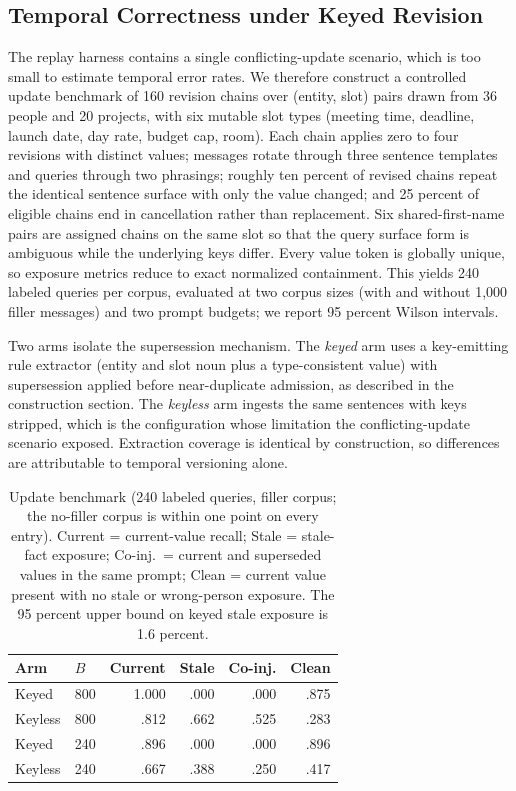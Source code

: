 \documentclass[letterpaper]{article} %
\begin{document}
\subsection{Temporal Correctness under Keyed Revision}

The replay harness contains a single conflicting-update scenario, which is too small to estimate temporal error rates. We therefore construct a controlled update benchmark of 160 revision chains over (entity, slot) pairs drawn from 36 people and 20 projects, with six mutable slot types (meeting time, deadline, launch date, day rate, budget cap, room). Each chain applies zero to four revisions with distinct values; messages rotate through three sentence templates and queries through two phrasings; roughly ten percent of revised chains repeat the identical sentence surface with only the value changed; and 25 percent of eligible chains end in cancellation rather than replacement. Six shared-first-name pairs are assigned chains on the same slot so that the query surface form is ambiguous while the underlying keys differ. Every value token is globally unique, so exposure metrics reduce to exact normalized containment. This yields 240 labeled queries per corpus, evaluated at two corpus sizes (with and without 1{,}000 filler messages) and two prompt budgets; we report 95 percent Wilson intervals.

Two arms isolate the supersession mechanism. The \emph{keyed} arm uses a key-emitting rule extractor (entity and slot noun plus a type-consistent value) with supersession applied before near-duplicate admission, as described in the construction section. The \emph{keyless} arm ingests the same sentences with keys stripped, which is the configuration whose limitation the conflicting-update scenario exposed. Extraction coverage is identical by construction, so differences are attributable to temporal versioning alone.

\begin{table}[t]
\centering
\small
\begin{tabular}{@{}llrrrr@{}}
\toprule
Arm & $B$ & Current & Stale & Co-inj. & Clean \\
\midrule
Keyed   & 800 & 1.000 & .000 & .000 & .875 \\
Keyless & 800 & .812  & .662 & .525 & .283 \\
Keyed   & 240 & .896  & .000 & .000 & .896 \\
Keyless & 240 & .667  & .388 & .250 & .417 \\
\bottomrule
\end{tabular}
\caption{Update benchmark (240 labeled queries, filler corpus; the no-filler corpus is within one point on every entry). Current = current-value recall; Stale = stale-fact exposure; Co-inj.\ = current and superseded values in the same prompt; Clean = current value present with no stale or wrong-person exposure. The 95 percent upper bound on keyed stale exposure is 1.6 percent.}
\label{tab:temporal}
\end{table}
\end{document}
